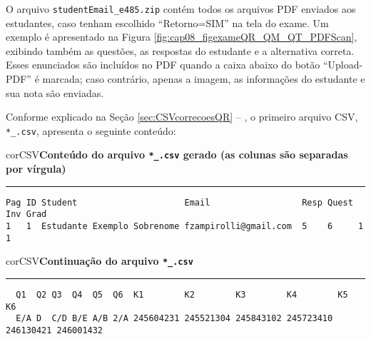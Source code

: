 O arquivo \verb|studentEmail_e485.zip| contém todos os arquivos PDF enviados aos estudantes, caso tenham escolhido ``Retorno=SIM'' na tela do exame. Um exemplo é apresentado na Figura \ref{fig:cap08_figexameQR_QM_QT_PDFScan}, exibindo também as questões, as respostas do estudante e a alternativa correta. Esses enunciados são incluídos no PDF quando a caixa abaixo do botão ``Upload-PDF'' é marcada; caso contrário, apenas a imagem, as informações do estudante e sua nota são enviadas. 


Conforme explicado na Seção \ref{sec:CSVcorrecoesQR} -- , o primeiro arquivo CSV, \verb|*_.csv|, apresenta o seguinte conteúdo:


\begin{myboxCode}{corCSV}{\textbf{Conteúdo do arquivo \texttt{*\_.csv} gerado (as colunas são separadas por vírgula)}}\vspace{3mm}
\hrule
{\scriptsize
\begin{verbatim}
Pag ID Student                     Email                  Resp Quest Inv Grad 
1   1  Estudante Exemplo Sobrenome fzampirolli@gmail.com  5    6     1   1  
\end{verbatim}
}
\end{myboxCode}


\begin{myboxCode}{corCSV}{\textbf{Continuação do arquivo \texttt{*\_.csv}}}\vspace{3mm}
  \hrule
  {\scriptsize
  \begin{verbatim}
  Q1  Q2 Q3  Q4  Q5  Q6  K1        K2        K3        K4        K5        K6
  E/A D  C/D B/E A/B 2/A 245604231 245521304 245843102 245723410 246130421 246001432
  \end{verbatim}
  }
  \end{myboxCode}


